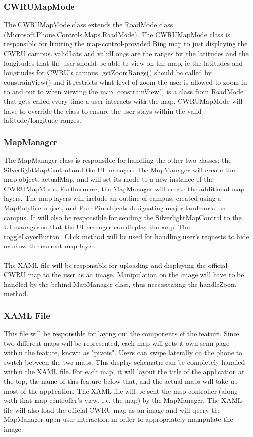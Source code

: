 \documentclass[pdftex,12pt,letter]{article}
\begin{document}
\subsubsection{CWRUMapMode}
The CWRUMapMode class extends the RoadMode class \\(Microsoft.Phone.Controls.Maps.RoadMode). The CWRUMapMode class is responsible for limiting the map-control-provided Bing map to just displaying the CWRU campus. validLats and validLongs are the ranges for the latitudes and the longitudes that the user should be able to view on the map, ie the latitudes and longitudes for CWRU's campus. getZoomRange() should be called by constrainView() and it restricts what level of zoom the user is allowed to zoom in to and out to when viewing the map. constrainView() is a class from RoadMode that gets called every time a user interacts with the map. CWRUMapMode will have to override the class to ensure the user stays within the valid latitude/longitude ranges.
\subsubsection{MapManager}
The MapManager class is responsible for handling the other two classes: the SilverlightMapControl and the UI manager. The MapManager will create the map object, actualMap, and will set its mode to a new instance of the CWRUMapMode. Furthermore, the MapManager will create the additional map layers. The map layers will include an outline of campus, created using a MapPolyline object, and PushPin objects designating major landmarks on campus.  It will also be responsible for sending the SilverlightMapControl to the UI manager so that the UI manager can display the map. The toggleLayerButton\_Click method will be used for handling user's requests to hide or show the current map layer.\\\\The XAML file will be responsible for uploading and displaying the official CWRU map to the user as an image. Manipulation on the image will have to be handled by the behind MapManager class, thus necessitating the handleZoom method.
\subsubsection{XAML File}
This file will be responsible for laying out the components of the feature. Since two different maps will be represented, each map will gets it own semi page within the feature, known as "pivots". Users can swipe laterally on the phone to switch between the two maps. This display schematic can be completely handled within the XAML file. For each map, it will layout the title of the application at the top, the name of this feature below that, and the actual maps will take up most of the application. The XAML file will be sent the map controller (along with that map controller's view, i.e. the map) by the MapManager. The XAML file will also load the official CWRU map as an image and will query the MapManager upon user interaction in order to appropriately manipulate the image.
\end{document}
